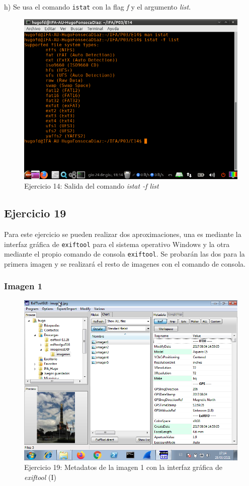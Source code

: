 \documentclass[11pt]{article}
\begin{document}
h) Se usa el comando \verb|istat| con la flag \textit{f} y el argumento \textit{list}.

\begin{figure}[H]
    \caption{Ejercicio 14: Salida del comando \textit{istat -f list}}
    \centering
    \includegraphics[scale=0.7]{p03/e14-7.png}
\end{figure}

\subsection{Ejercicio 19}
Para este ejercicio se pueden realizar dos aproximaciones, una es mediante la interfaz gráfica de \verb|exiftool| para el sistema operativo Windows y la otra mediante el propio comando de consola \verb|exiftool|. Se probarán las dos para la primera imagen y se realizará el resto de imagenes con el comando de consola.

\subsubsection{Imagen 1}

\begin{figure}[H]
    \caption{Ejercicio 19: Metadatos de la imagen 1 con la interfaz gráfica de \textit{exiftool} (I)}
    \centering
    \includegraphics[scale=0.7]{p03/e19-1.png}
\end{figure}
\end{document}
